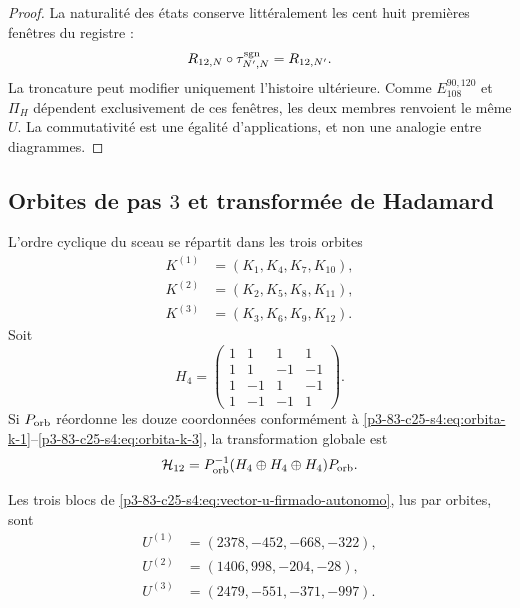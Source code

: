 \begin{proof}
La naturalité des états conserve littéralement les cent huit premières
fenêtres du registre :
\[
 R_{12,N}\circ\tau_{N',N}^{\rm sgn}=R_{12,N'}.
\]
La troncature peut modifier uniquement l’histoire ultérieure. Comme
\(E_{108}^{90,120}\) et \(\Pi_H\) dépendent exclusivement de ces fenêtres,
les deux membres renvoient le même \(U\). La commutativité est une égalité
d’applications, et non une analogie entre diagrammes.
\end{proof}

\subsection{Orbites de pas \(3\) et transformée de Hadamard}

L’ordre cyclique du sceau se répartit dans les trois orbites
\begin{align}
 K^{(1)}&=(K_1,K_4,K_7,K_{10}),
 \label{p3-83-c25-s4:eq:orbita-k-1}\\
 K^{(2)}&=(K_2,K_5,K_8,K_{11}),
 \label{p3-83-c25-s4:eq:orbita-k-2}\\
 K^{(3)}&=(K_3,K_6,K_9,K_{12}).
 \label{p3-83-c25-s4:eq:orbita-k-3}
\end{align}
Soit
\begin{equation}
 H_4=
 \begin{pmatrix}
 1&1&1&1\\
 1&1&-1&-1\\
 1&-1&1&-1\\
 1&-1&-1&1
 \end{pmatrix}.
 \label{p3-83-c25-s4:eq:matriz-hadamard-cuatro-autonoma}
\end{equation}
Si \(P_{\rm orb}\) réordonne les douze coordonnées conformément à
\eqref{p3-83-c25-s4:eq:orbita-k-1}--\eqref{p3-83-c25-s4:eq:orbita-k-3}, la transformation globale est
\begin{equation}
 \mathcal H_{12}
 =P_{\rm orb}^{-1}
 (H_4\oplus H_4\oplus H_4)P_{\rm orb}.
 \label{p3-83-c25-s4:eq:hadamard-global-doce}
\end{equation}

Les trois blocs de \eqref{p3-83-c25-s4:eq:vector-u-firmado-autonomo}, lus par
orbites, sont
\begin{align*}
 U^{(1)}&=(2378,-452,-668,-322),\\
 U^{(2)}&=(1406,998,-204,-28),\\
 U^{(3)}&=(2479,-551,-371,-997).
\end{align*}

